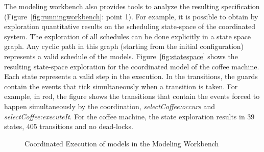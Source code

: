 The modeling workbench also provides tools to analyze the resulting \ccsl specification (Figure~\ref{fig:runningworkbench}: point 1). For example, it is possible to obtain by exploration quantitative results on the scheduling state-space of the coordinated system. The exploration of all schedules can be done explicitly in a state space graph. Any cyclic path in this graph (starting from the initial configuration) represents a valid schedule of the models. Figure~\ref{fig:statespace} shows the resulting state-space exploration for the coordinated model of the coffee machine. Each state represents a valid step in the execution. In the transitions, the guards contain the events that tick simultaneously when a transition is taken. For example, in red, the figure shows the transitions that contain the events forced to happen simultaneously by the coordination, \eg \emph{selectCoffee:occurs} and \emph{selectCoffee:executeIt}. For the coffee machine, the state exploration results in 39 states, 405 transitions and no dead-locks.    


\begin{figure}[]
	\centering
	\caption{Coordinated Execution of models in the Modeling Workbench}
	\label{fig:subfigureExample1}
\end{figure}

